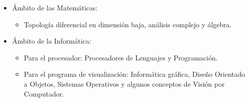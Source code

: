\begin{itemize}
	\item Ámbito de las Matemáticas:
	\begin{itemize}
		\item Topología diferencial en dimensión baja, análisis complejo y álgebra.
	\end{itemize}
	\item Ámbito de la Informática:
	\begin{itemize}
		\item Para el procesador: Procesadores de Lenguajes y Programación.
		\item Para el programa de visualización: Informática gráfica, Diseño Orientado a Objetos, Sistemas Operativos y algunos conceptos de Visión por Computador.
	\end{itemize}
\end{itemize}

\endinput
